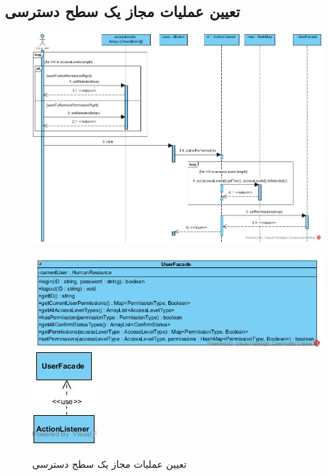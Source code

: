 \begin{landscape}
\section{تعیین عملیات مجاز یک سطح دسترسی}
\begin{figure}[H]
	\centering
	\includegraphics[scale=0.7]{img/sequence-design/SetPermissions}
\end{figure}
\begin{figure}[H]
	\centering
	\includegraphics[scale=0.8]{img/sequence-design/SetPermissionsC}
	\includegraphics[scale=0.8]{img/sequence-design/SetPermissionsUI}
	\caption{تعیین عملیات مجاز یک سطح دسترسی}
\end{figure}


\newpage

\end{landscape}
